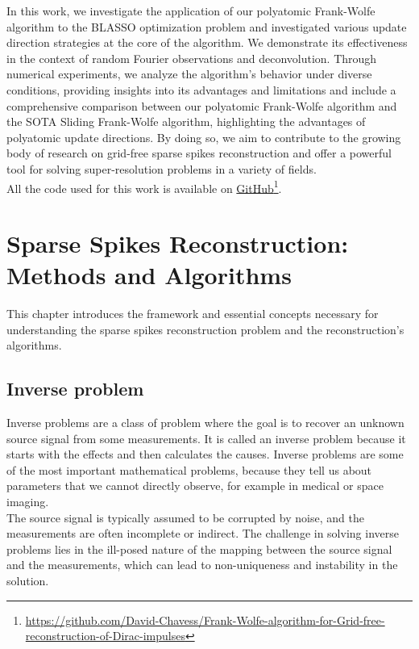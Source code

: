 \documentclass[a4paper,12pt,oneside]{report}
\theoremstyle{named}
\begin{document}
In this work, we investigate the application of our polyatomic Frank-Wolfe algorithm to the BLASSO optimization problem and investigated various update direction strategies at the core of the algorithm. We demonstrate its effectiveness in the context of random Fourier observations and deconvolution. Through numerical experiments, we analyze the algorithm’s behavior under diverse conditions, providing insights into its advantages and limitations and include a comprehensive comparison between our polyatomic Frank-Wolfe algorithm and the SOTA Sliding Frank-Wolfe algorithm, highlighting the advantages of polyatomic update directions. By doing so, we aim to contribute to the growing body of research on grid-free sparse spikes reconstruction and offer a powerful tool for solving super-resolution problems in a variety of fields.\\

 All the code used for this work is available on \href{https://github.com/David-Chavess/Frank-Wolfe-algorithm-for-Grid-free-reconstruction-of-Dirac-impulses}{GitHub}\footnote{\url{https://github.com/David-Chavess/Frank-Wolfe-algorithm-for-Grid-free-reconstruction-of-Dirac-impulses}}.

\chapter{Sparse Spikes Reconstruction: Methods and Algorithms}
This chapter introduces the framework and essential concepts necessary for understanding the sparse spikes reconstruction problem and the reconstruction's algorithms.

\section{Inverse problem}

Inverse problems are a class of problem where the goal is to recover an unknown source signal from some measurements. It is called an inverse problem because it starts with the effects and then calculates the causes. Inverse problems are some of the most important mathematical problems, because they tell us about parameters that we cannot directly observe, for example in medical or space imaging. \\

The source signal is typically assumed to be corrupted by noise, and the measurements are often incomplete or indirect. The challenge in solving inverse problems lies in the ill-posed nature of the mapping between the source signal and the measurements, which can lead to non-uniqueness and instability in the solution.\\
\end{document}
